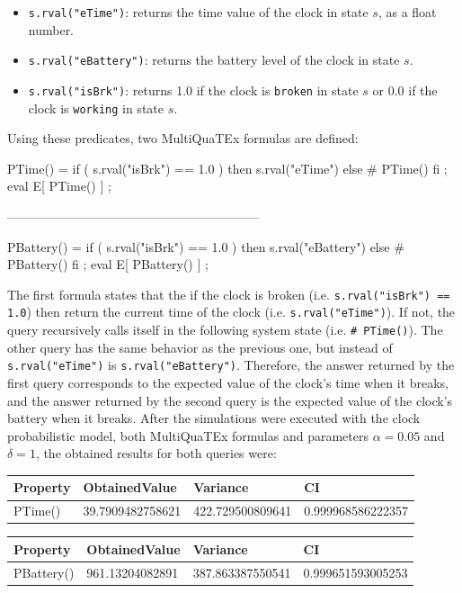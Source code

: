 \begin{itemize}
    \item \texttt{s.rval("eTime")}: returns the time value of the clock in state $s$, as a float number.
    \item \texttt{s.rval("eBattery")}: returns the battery level of the clock in state $s$.
    \item \texttt{s.rval("isBrk")}: returns 1.0 if the clock is \texttt{broken} in state $s$ or 0.0 if the clock is \texttt{working} in state $s$.
\end{itemize}
Using these predicates, two MultiQuaTEx formulas are defined:
\\
\begin{maude2}
PTime() = if ( s.rval("isBrk") == 1.0 ) 
          then s.rval("eTime") else # PTime() fi ;
eval E[ PTime() ] ;

------------------------------------------------------------

PBattery() = if ( s.rval("isBrk") == 1.0 ) 
             then s.rval("eBattery") else # PBattery() fi ;
eval E[ PBattery() ] ;
\end{maude2}
The first formula states that the if the clock is broken (i.e. \texttt{s.rval("isBrk") == 1.0}) then return the current time of the clock (i.e. \texttt{s.rval("eTime")}). If not, the query recursively calls itself in the following system state (i.e. \texttt{\# PTime()}). The other query has the same behavior as the previous one, but instead of \texttt{s.rval("eTime")} is \texttt{s.rval("eBattery")}. Therefore, the answer returned by the first query corresponds to the expected value of the clock's time when it breaks, and the answer returned by the second query is the expected value of the clock's battery when it breaks. After the simulations were executed with the clock probabilistic model, both MultiQuaTEx formulas and parameters $\alpha = 0.05$ and $\delta = 1$, the obtained results for both queries were:
\begin{table}[H]
\centering
\begin{tabular}{|l|l|l|l|}
\hline
Property & ObtainedValue    & Variance         & CI                 \\ \hline
PTime()  & 39.7909482758621 & 422.729500809641 & 0.999968586222357         \\ \hline
\end{tabular}
\end{table}
\begin{table}[H]
\centering
\begin{tabular}{|l|l|l|l|}
\hline
Property   & ObtainedValue   & Variance         & CI                 \\ \hline
PBattery() & 961.13204082891 & 387.863387550541 & 0.999651593005253 \\ \hline
\end{tabular}
\end{table}

